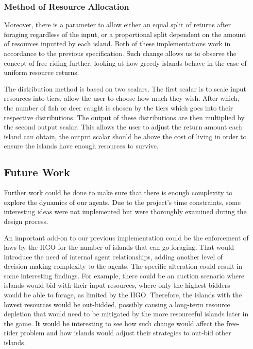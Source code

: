 \subsubsection{Method of Resource Allocation}

Moreover, there is a parameter to allow either an equal split of returns after foraging regardless of the input, or a proportional split dependent on the amount of resources inputted by each island. Both of these implementations work in accordance to the previous specification. Such change allows us to observe the concept of free-riding further, looking at how greedy islands behave in the case of uniform resource returns.

The distribution method is based on two scalars. The first scalar is to scale input resources into tiers, allow the user to choose how much they wish. After which, the number of fish or deer caught is chosen by the tiers which goes into their respective distributions. The output of these distributions are then multiplied by the second output scalar. This allows the user to adjust the return amount each island can obtain, the output scalar should be above the cost of living in order to ensure the islands have enough resources to survive.  

\subsection{Future Work}

Further work could be done to make sure that there is enough complexity to explore the dynamics of our agents. Due to the project’s time constraints, some interesting ideas were not implemented but were thoroughly examined during the design process.

An important add-on to our previous implementation could be the enforcement of laws by the IIGO for the number of islands that can go foraging. That would introduce the need of internal agent relationships, adding another level of decision-making complexity to the agents. The specific alteration could result in some interesting findings. For example, there could be an auction scenario where islands would bid with their input resources, where only the highest bidders would be able to forage, as limited by the IIGO. Therefore, the islands with the lowest resources would be out-bidded, possibly causing a long-term resource depletion that would need to be mitigated by the more resourceful islands later in the game. It would be interesting to see how such change would affect the free-rider problem and how islands would adjust their strategies to out-bid other islands.

